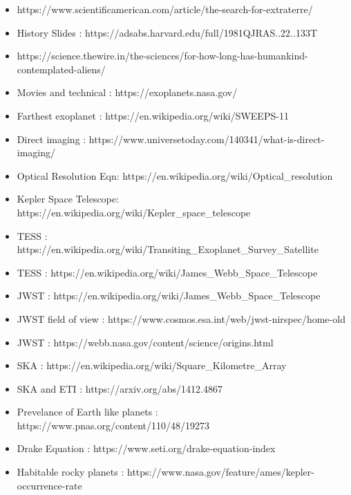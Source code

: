 \documentclass{beamer}
\begin{document}
\begin{frame}
\begin{itemize}
    \item \scriptsize{https://www.scientificamerican.com/article/the-search-for-extraterre/}
    \item History Slides : \scriptsize{https://adsabs.harvard.edu/full/1981QJRAS..22..133T}
    \item \scriptsize{https://science.thewire.in/the-sciences/for-how-long-has-humankind-contemplated-aliens/}
    \item Movies and technical : \scriptsize{https://exoplanets.nasa.gov/}
    \item Farthest exoplanet : \scriptsize{https://en.wikipedia.org/wiki/SWEEPS-11}
    \item Direct imaging : \scriptsize{https://www.universetoday.com/140341/what-is-direct-imaging/}
    \item Optical Resolution Eqn: \scriptsize{https://en.wikipedia.org/wiki/Optical\_resolution}
    \item Kepler Space Telescope: \scriptsize{https://en.wikipedia.org/wiki/Kepler\_space\_telescope}
    \item TESS : \scriptsize{https://en.wikipedia.org/wiki/Transiting\_Exoplanet\_Survey\_Satellite}
    \item TESS : \scriptsize{https://en.wikipedia.org/wiki/James\_Webb\_Space\_Telescope}
    \item JWST : \scriptsize{https://en.wikipedia.org/wiki/James\_Webb\_Space\_Telescope}
    \item JWST field of view : \scriptsize{https://www.cosmos.esa.int/web/jwst-nirspec/home-old}
    \item JWST : \scriptsize{https://webb.nasa.gov/content/science/origins.html}
    \item SKA : \scriptsize{https://en.wikipedia.org/wiki/Square\_Kilometre\_Array}
    \item SKA and ETI : \scriptsize{https://arxiv.org/abs/1412.4867}
    \item Prevelance of Earth like planets : \scriptsize{https://www.pnas.org/content/110/48/19273}
    \item Drake Equation : \scriptsize{https://www.seti.org/drake-equation-index}
    \item Habitable rocky planets : \scriptsize{https://www.nasa.gov/feature/ames/kepler-occurrence-rate}

\end{itemize}
\end{frame}
\end{document}
